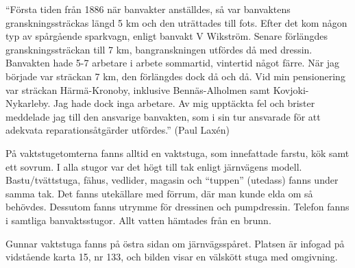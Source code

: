 

``Första tiden från 1886 när banvakter anställdes, så var banvaktens granskningssträckas längd 5 km och den uträttades till fots. Efter det kom någon typ av spårgående sparkvagn, enligt banvakt V Wikström. Senare förlängdes granskningssträckan till 7 km, bangranskningen utfördes då med dressin. Banvakten hade 5-7 arbetare i arbete sommartid, vintertid något färre. När jag började var sträckan 7 km, den förlängdes dock då och då. Vid min pensionering var sträckan Härmä-Kronoby, inklusive Bennäs-Alholmen samt Kovjoki-Nykarleby. Jag hade dock inga arbetare. Av mig upptäckta fel och brister meddelade jag till den ansvarige banvakten, som i sin tur ansvarade för att adekvata reparationsåtgärder utfördes.'' (Paul Laxén)

På vaktstugetomterna fanns alltid en vaktstuga, som innefattade farstu, kök samt ett sovrum. I alla stugor var det högt till tak enligt järnvägens modell. Bastu/tvättstuga, fähus, vedlider, magasin och ``tuppen'' (utedass) fanns under samma tak. Det fanns utekällare med förrum, där man kunde elda om så behövdes. Dessutom fanns utrymme för dressinen och pumpdressin. Telefon fanns i samtliga banvaktsstugor. Allt vatten hämtades från en brunn.

Gunnar vaktstuga fanns på östra sidan om järnvägsspåret. Platsen är infogad på vidstående karta 15, nr 133, och bilden visar en välskött stuga med omgivning.

